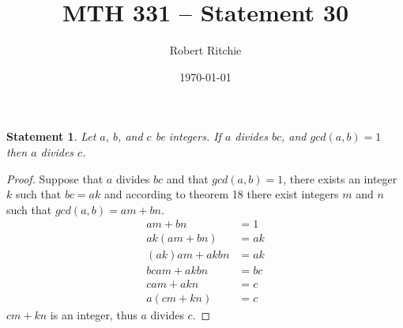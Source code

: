 \documentclass[11pt]{article}
\newtheorem{statement}{Statement}%
\begin{document}
\author{Robert Ritchie}
\title{MTH 331 -- Statement 30}
\date{\today}

\maketitle

\begin{statement}
Let $a$, $b$, and $c$ be integers. If $a$ divides $bc$, and $gcd(a,b)=1$ then $a$ divides $c$.
\end{statement}

\begin{proof}
Suppose that $a$ divides $bc$ and that $gcd(a,b)=1$, there exists an integer $k$ such that $bc=ak$ and according to theorem 18 there exist integers $m$ and $n$ such that $gcd(a,b)=am+bn$.
\begin{align*}
am+bn&=1\\
ak(am+bn)&=ak\\
(ak)am+akbn&=ak\\
bcam+akbn&=bc\\
cam+akn&=c\\
a(cm+kn)&=c
\end{align*}
$cm+kn$ is an integer, thus $a$ divides $c$.
\end{proof}
\end{document}
